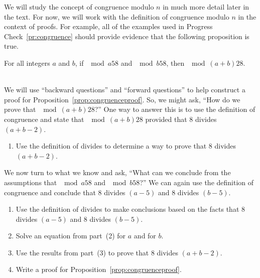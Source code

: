 We will study the concept of congruence modulo  $n$  in much more detail later in the text.  For now, we will work with the definition of congruence modulo $n$  in the context of proofs.  For example, all of the examples used in Progress Check~\ref{pr:congruence} should provide evidence that the following proposition is true.
\begin{proposition} \label{prop:congruenceproof}
For all integers $a$ and $b$, if $\mod{a}{5}{8}$ and $\mod{b}{5}{8}$, then 
$\mod{(a + b)}{2}{8}$.
\end{proposition}
%
\begin{prog}\label{pr:congruence2} \hfill \\
We will use ``backward questions'' and ``forward questions'' to help construct a proof for Proposition~\ref{prop:congruenceproof}.  So, we might ask, ``How do we prove that 
$\mod{(a + b)}{2}{8}$?''  One way to answer this is to use the definition of congruence and state that $\mod{(a + b)}{2}{8}$ provided that 8 divides $(a + b - 2)$.
\begin{enumerate}
  \item Use the definition of divides to determine a way to prove that 8 divides $(a + b - 2)$.
\end{enumerate}

We now turn to what we know and ask, ``What can we conclude from the assumptions that 
$\mod{a}{5}{8}$ and $\mod{b}{5}{8}$?''  We can again use the definition of congruence and conclude that 8 divides $(a - 5)$ and 8 divides $(b - 5)$.
\end{prog}
\setcounter{oldenumi}{\theenumi}
\begin{enumerate} \setcounter{enumi}{\theoldenumi}
\item Use the definition of divides to make conclusions based on the facts that 8 divides 
$(a - 5)$ and 8 divides $(b - 5)$.
\item Solve an equation from part~(2) for $a$ and for $b$.
\item Use the results from part~(3) to prove that 8 divides $(a + b - 2)$.
\item Write a proof for Proposition~\ref{prop:congruenceproof}.
\end{enumerate}

%
\hbreak

\endinput
